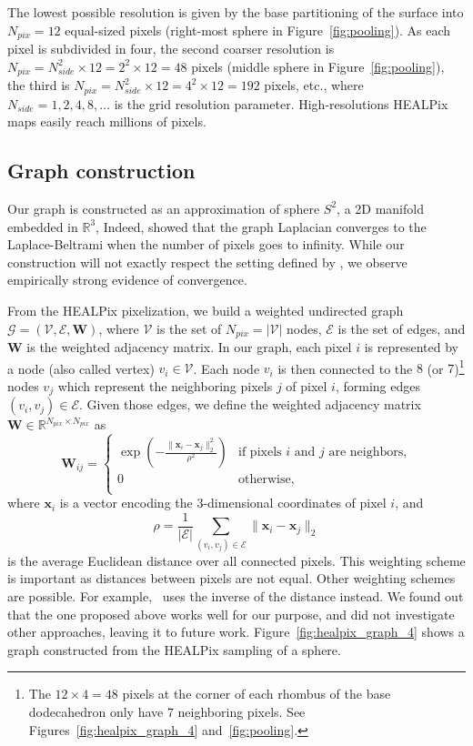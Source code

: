 \documentclass[final,twocolumn,3p,times,sort&compress]{elsarticle}
\newcommand{\figref}[1]{Figure~\ref{fig:#1}}
\renewcommand{\b}[1]{{\bm{#1}}}   %
\newcommand{\1}{\b{1}}              %
\newcommand{\0}{\b{0}}              %
\newcommand{\G}{\mathcal{G}}
\newcommand{\V}{\mathcal{V}}
\newcommand{\E}{\mathcal{E}}
\newcommand{\W}{\b{W}}
\newcommand{\x}{\b{x}}
\newcommand{\R}{\mathbb{R}}
\begin{document}
The lowest possible resolution is given by the base partitioning of the surface into $N_{pix} = 12$ equal-sized pixels (right-most sphere in \figref{pooling}).
As each pixel is subdivided in four, the second coarser resolution is $N_{pix} = N_{side}^2 \times 12 = 2^2 \times 12 = 48$ pixels (middle sphere in \figref{pooling}), the third is $N_{pix} = N_{side}^2 \times 12 = 4^2 \times 12 = 192$ pixels, etc., where $N_{side} = 1, 2, 4, 8, \ldots$ is the grid resolution parameter.
High-resolutions HEALPix maps easily reach millions of pixels.

\subsection{Graph construction}

Our graph is constructed as an approximation of sphere $S^2$, a 2D manifold embedded in $\mathbb{R}^3$,
Indeed, \citep{belkin2007convergence} showed that the graph Laplacian converges to the Laplace-Beltrami when the number of pixels goes to infinity.
While our construction will not exactly respect the setting defined by \citep{belkin2007convergence}, we observe empirically strong evidence of convergence.

From the HEALPix pixelization, we build a weighted undirected graph $\G = (\V, \E, \W)$, where $\V$ is the set of $N_{pix} = |\V|$ nodes, $\E$ is the set of edges, and $\W$ is the weighted adjacency matrix.
In our graph, each pixel $i$ is represented by a node (also called vertex) $v_i \in \V$.
Each node $v_i$ is then connected to the $8$ (or $7$)\footnote{\label{neighbors}The $12 \times 4 = 48$ pixels at the corner of each rhombus of the base dodecahedron only have 7 neighboring pixels. See Figures~\ref{fig:healpix_graph_4} and~\ref{fig:pooling}.} nodes $v_j$ which represent the neighboring pixels $j$ of pixel $i$, forming edges $(v_i, v_j) \in \E$. Given those edges, we define the weighted adjacency matrix $\W \in \R^{N_{pix} \times N_{pix}}$ as
\begin{equation*}
	\W_{ij} = \begin{cases}
		\exp \left( -\frac{\|\x_i-\x_j\|_2^2}{\rho^2} \right) & \text{if pixels $i$ and $j$ are neighbors,} \\
		0 & \text{otherwise,} \\
	\end{cases}
\end{equation*}
where $\x_i$ is a vector encoding the 3-dimensional coordinates of pixel $i$, and
\begin{equation*}
	\rho = \frac{1}{|\E|} \sum_{(v_i, v_j) \in \E} \|\x_i-\x_j\|_2
\end{equation*}
is the average Euclidean distance over all connected pixels. This weighting scheme is important as distances between pixels are not equal.
Other weighting schemes are possible. For example,~\cite{khasanova2017graphomni} uses the inverse of the distance instead. We found out that the one proposed above works well for our purpose, and did not investigate other approaches, leaving it to future work.
\figref{healpix_graph_4} shows a graph constructed from the HEALPix sampling of a sphere.
\end{document}
